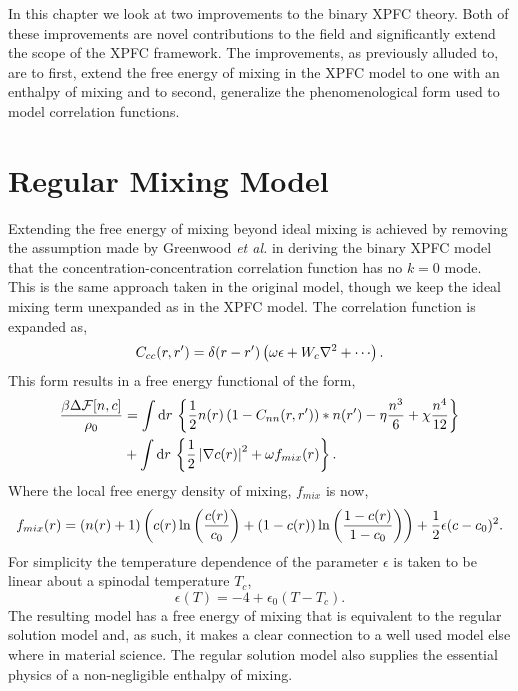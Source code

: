 \label{chapter:improvements}

In this chapter we look at two improvements to the binary XPFC theory. Both of
these improvements are novel contributions to the field and significantly
extend the scope of the XPFC framework. The improvements, as previously alluded
to, are to first, extend the free energy of mixing in the XPFC model to one
with an enthalpy of mixing and to second, generalize the phenomenological form
used to model correlation functions.

\section{Regular Mixing Model} %

Extending the free energy of mixing beyond ideal mixing is achieved by removing
the assumption made by Greenwood \textit{et al.} in deriving the binary XPFC
model that the concentration-concentration correlation function has no $k=0$
mode.  This is the same approach taken in the original model, though we keep
the ideal mixing term unexpanded as in the XPFC model. The correlation function
is expanded as,
%
\begin{equation}
    C_{cc}(r, r^\prime) = \d(r - r^\prime)
        \l(\omega\epsilon + W_c\nabla^2 + \cdots\r).
\end{equation}
%
This form results in a free energy functional of the form,
%
\begin{align}
    \frac{\beta\Delta\mathcal{F}[n, c]}{\rho_0} &= \int \mathrm{d}r\, \left\lbrace
        \frac{1}{2} n(r) \left(1 - C_{nn}(r, r^\prime)\right) \ast n(r^\prime)
        - \eta \frac{n^3}{6} + \chi \frac{n^4}{12} \right\rbrace \\
        &+ \int \mathrm{d}r\,\left\lbrace
            \frac{1}{2}\left\vert \nabla c(r) \right\vert^2 + \omega f_{mix}(r)
            \right\rbrace. \nonumber
\end{align}
%
Where the local free energy density of mixing, $f_{mix}$ is now,
%
\begin{equation}
    f_{mix}(r) = \left(n(r) + 1\right)\left(
            c(r)\ln\left(\frac{c(r)}{c_0}\right)
          + (1-c(r))\ln\left(\frac{1-c(r)}{1-c_0}\right) \right)
          + \frac{1}{2} \epsilon (c - c_0)^2.
\end{equation}
%
For simplicity the temperature dependence of the parameter $\epsilon$ is taken
to be linear about a spinodal temperature $T_c$,
%
\begin{equation}
    \label{eq:spinodal_model}
    \epsilon(T) = -4 + \epsilon_0(T - T_c).
\end{equation}
%
The resulting model has a free energy of mixing that is equivalent to the
regular solution model and, as such, it makes a clear connection to a well used
model else where in material science. The regular solution model also supplies
the essential physics of a non-negligible enthalpy of mixing.

